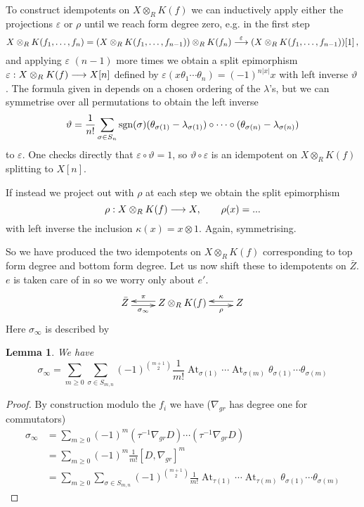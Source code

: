 \documentclass{compositio}
\newtheorem{lemma}[theorem]{Lemma}
\theoremstyle{definition}
\numberwithin{equation}{section}
\DeclareMathOperator{\At}{At}
\begin{document}
To construct idempotents on $X \otimes_R K(f)$ we can inductively apply either the projections $\varepsilon$ or $\rho$ until we reach form degree zero, e.g. in the first step
\[
X \otimes_R K(f_1,\ldots,f_n) = (X \otimes_R K(f_1,\ldots,f_{n-1})) \otimes_R K(f_n) \stackrel{\varepsilon}{\longrightarrow} (X \otimes_R K(f_1,\ldots,f_{n-1}))[1]\,,
\]
and applying $\varepsilon$ $(n-1)$ more times we obtain a split epimorphism $\varepsilon: X \otimes_R K(f) \longrightarrow X[n]$ defined by $\varepsilon(x \theta_1 \cdots \theta_n) = (-1)^{n|x|} x$ with left inverse $\vartheta$. The formula given in \cite[Section 4]{dm1102.2957} depends on a chosen ordering of the $\lambda$'s, but we can symmetrise over all permutations to obtain the left inverse
\[
\vartheta = \frac{1}{n!} \sum_{\sigma \in S_n} \textup{sgn}(\sigma) (\theta_{\sigma(1)} - \lambda_{\sigma(1)}) \circ \cdots \circ (\theta_{\sigma(n)} - \lambda_{\sigma(n)})
\]
to $\varepsilon$. One checks directly that $\varepsilon \circ \vartheta = 1$, so $\vartheta \circ \varepsilon$ is an idempotent on $X \otimes_R K(f)$ splitting to $X[n]$.

If instead we project out with $\rho$ at each step we obtain the split epimorphism
\[
\rho: X \otimes_R K(f) \longrightarrow X, \qquad \rho(x) = ...
\]
with left inverse the inclusion $\kappa(x) = x \otimes 1$. Again, symmetrising.

So we have produced the two idempotents on $X \otimes_R K(f)$ corresponding to top form degree and bottom form degree. Let us now shift these to idempotents on $\bar{Z}$. $e$ is taken care of in \cite{??} so we worry only about $e'$.
\[
\xymatrix{
\bar{Z} \ar@<-0.5ex>[r]_-{\sigma_\infty} & Z \otimes_R K(f) \ar@<-0.5ex>[l]_-{\pi} \ar@<-0.5ex>[r]_-{\rho} & Z \ar@<-0.5ex>[l]_-{\kappa}
}
\]
Here $\sigma_\infty$ is described by

\begin{lemma} We have
\[
\sigma_\infty = \sum_{m \ge 0} \sum_{\sigma \in S_{m,n}} (-1)^{\binom{m+1}{2}} \frac{1}{m!} \At_{\sigma(1)} \cdots \At_{\sigma(m)} \theta_{\sigma(1)} \cdots \theta_{\sigma(m)}
\]
\end{lemma}
\begin{proof}
By construction modulo the $f_i$ we have ($\nabla_{gr}$ has degree one for commutators)
\begin{align*}
\sigma_\infty &= \sum_{m \ge 0} (-1)^m (\tau^{-1} \nabla_{gr} D) \cdots (\tau^{-1} \nabla_{gr} D) \,\\
&= \sum_{m \ge 0} (-1)^m \frac{1}{m!} [ D, \nabla_{gr} ]^m \\
&= \sum_{m \ge 0} \sum_{\sigma \in S_{m,n}} (-1)^{\binom{m+1}{2}} \frac{1}{m!} \At_{\tau(1)} \cdots \At_{\tau(m)} \theta_{\sigma(1)} \cdots \theta_{\sigma(m)}
\end{align*}
\end{proof}
\end{document}
